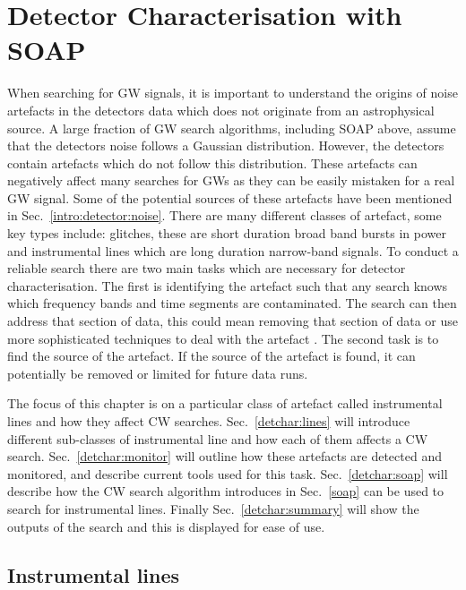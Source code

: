 \chapter{\label{detchar}Detector Characterisation with SOAP}

When searching for \gls{GW} signals, it is important to understand the origins of noise artefacts in the detectors data which does not originate from an astrophysical source.
A large fraction of \gls{GW} search algorithms, including SOAP above, assume that the detectors noise follows a Gaussian distribution.
However, the detectors contain artefacts which do not follow this distribution. 
These artefacts can negatively affect many searches for \glspl{GW} as they can be easily mistaken for a real \gls{GW} signal.
Some of the potential sources of these artefacts have been mentioned in Sec.~\ref{intro:detector:noise}. 
There are many different classes of artefact, some key types include: glitches, these are short duration broad band bursts in power and instrumental lines which are long duration narrow-band signals.
To conduct a reliable search there are two main tasks which are necessary for detector characterisation.
The first is identifying the artefact such that any search knows which frequency bands and time segments are contaminated.
The search can then address that section of data, this could mean removing that section of data or use more sophisticated techniques to deal with the artefact \citep{pankow2018MitigationInstrumental}.
The second task is to find the source of the artefact. 
If the source of the artefact is found, it can potentially be removed or limited for future data runs.

The focus of this chapter is on a particular class of artefact called instrumental lines and how they affect \gls{CW} searches.
Sec.~\ref{detchar:lines} will introduce different sub-classes of instrumental line and how each of them affects a \gls{CW} search.
Sec.~\ref{detchar:monitor} will outline how these artefacts are detected and monitored, and describe current tools used for this task.
Sec.~\ref{detchar:soap} will describe how the \gls{CW} search algorithm introduces in Sec.~\ref{soap} can be used to search for instrumental lines.
Finally Sec.~\ref{detchar:summary} will show the outputs of the search and this is displayed for ease of use.



\section{\label{detchar:lines}Instrumental lines}

